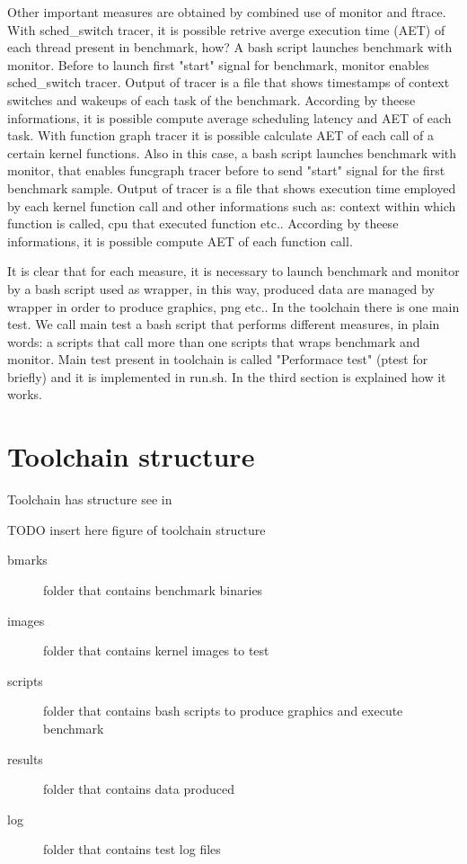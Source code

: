 \documentclass[a4paper,10pt]{article}
\begin{document}
\begin{multicols}{2}
Other important measures are obtained by combined use of monitor and ftrace.
With sched\_switch tracer, it is possible retrive averge execution time (AET) of each
thread present in benchmark, how? A bash script launches benchmark with monitor. 
Before to launch first "start" signal for benchmark, monitor enables sched\_switch tracer. 
Output of tracer is a file that shows timestamps of context switches and 
wakeups of each task of the benchmark. According by theese informations, it is possible 
compute average scheduling latency and AET of each task.
With function graph tracer it is possible calculate AET of each
call of a certain kernel functions. Also in this case, a bash script launches
benchmark with monitor, that enables funcgraph tracer before to send "start" signal
for the first benchmark sample. Output of tracer is a file that shows execution time employed by each
kernel function call and other informations such as: context within which function is called,
cpu that executed function etc..
According by theese informations, it is possible compute AET of each 
function call. 

It is clear that for each measure, it is necessary to launch benchmark and monitor by 
a bash script used as wrapper, in this way, produced data are managed by wrapper in order
to produce graphics, png etc..
In the toolchain there is one main test. We call main test a bash script that 
performs different measures, in plain words: a scripts that call more than one
scripts that wraps benchmark and monitor. Main test present in toolchain 
is called "Performace test" (ptest for briefly)
and it is implemented in run.sh. In the third section is explained how it works. 

\section{Toolchain structure}

Toolchain has structure see in 

TODO insert here figure of toolchain structure

\begin{description}
	\item[bmarks] folder that contains benchmark binaries 
	\item[images] folder that contains kernel images to test
	\item[scripts] folder that contains bash scripts to produce graphics and execute benchmark
	\item[results] folder that contains data produced
	\item[log] folder that contains test log files
\end{description}


\end{multicols}
\end{document}
